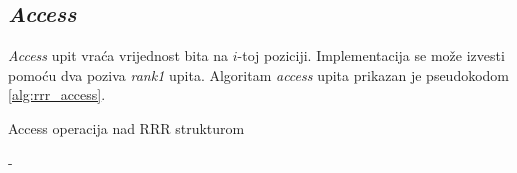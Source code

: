\subsection{\emph{Access}}

\emph{Access} upit vraća vrijednost bita na $i$-toj poziciji. Implementacija se može izvesti pomoću dva poziva \emph{rank1} upita. Algoritam \emph{access} upita prikazan je pseudokodom \ref{alg:rrr_access}.

\begin{algorithm}[H]
  \caption{Access operacija nad RRR strukturom \cite{bowe-th}\cite{breberic}}
  \begin{algorithmic}[1]
        \State \Return {}
      \Else
        \State \Return {} - 
      \EndIf
    \EndFunction
  \end{algorithmic}
  \label{alg:rrr_access}
\end{algorithm}
